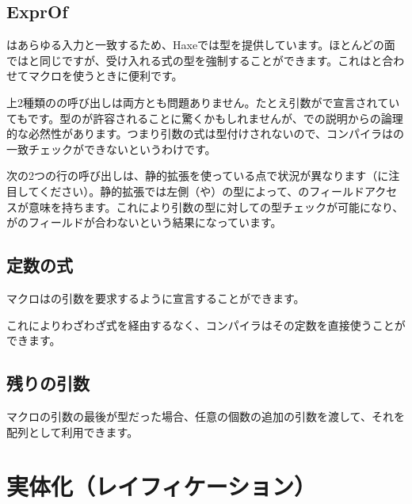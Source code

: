 \subsection{ExprOf}
\label{macro-ExprOf}

はあらゆる入力と一致するため、Haxeでは型を提供しています。ほとんどの面ではと同じですが、受け入れる式の型を強制することができます。これはと合わせてマクロを使うときに便利です。


上2種類のの呼び出しは両方とも問題ありません。たとえ引数がで宣言されていてもです。型のが許容されることに驚くかもしれませんが、での説明からの論理的な必然性があります。つまり引数の式は型付けされないので、コンパイラはの一致チェックができないというわけです。

次の2つの行の呼び出しは、静的拡張を使っている点で状況が異なります（に注目してください）。静的拡張では左側（や）の型によって、のフィールドアクセスが意味を持ちます。これにより引数の型に対しての型チェックが可能になり、がのフィールドが合わないという結果になっています。

\subsection{定数の式}
\label{macro-constant-arguments}

マクロはの引数を要求するように宣言することができます。


これによりわざわざ式を経由するなく、コンパイラはその定数を直接使うことができます。

\subsection{残りの引数}
\label{macro-rest-argument}

マクロの引数の最後が型だった場合、任意の個数の追加の引数を渡して、それを配列として利用できます。


\section{実体化（レイフィケーション）}
\label{macro-reification}

